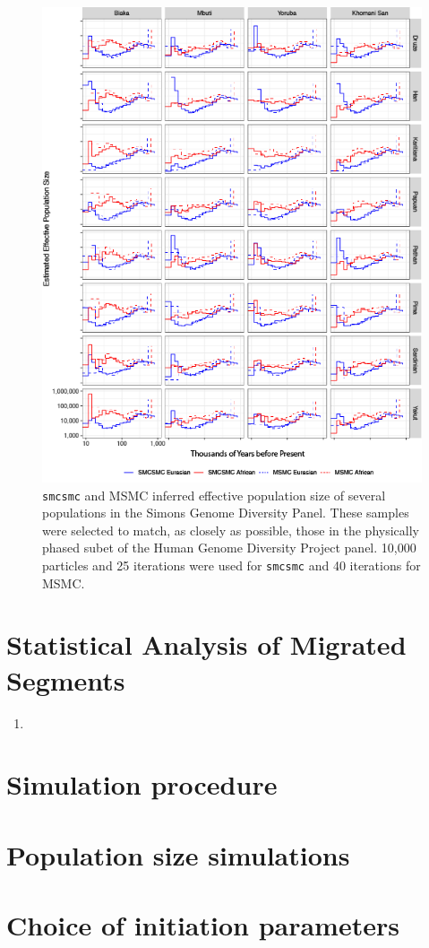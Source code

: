 \documentclass{article}
\begin{document}
\begin{figure}
    \centering
    \label{hgdp_sgdp_ne}
    \includegraphics[width=\linewidth]{../plot/sgdp_subset_ne.png}
    \caption{{\tt smcsmc} and MSMC inferred effective population size of several populations in the Simons Genome Diversity Panel. These samples were selected to match, as closely as possible, those in the physically phased subet of the Human Genome Diversity Project panel. 10,000 particles and 25 iterations were used for {\tt smcsmc} and 40 iterations for MSMC.}
\end{figure}

\section{Statistical Analysis of Migrated Segments} \label{dstats}


\begin{enumerate}
	\item 
\end{enumerate}

\section{Simulation procedure} \label{sim}
\section{Population size simulations} \label{ne}
\section{Choice of initiation parameters} \label{minit}
\end{document}
